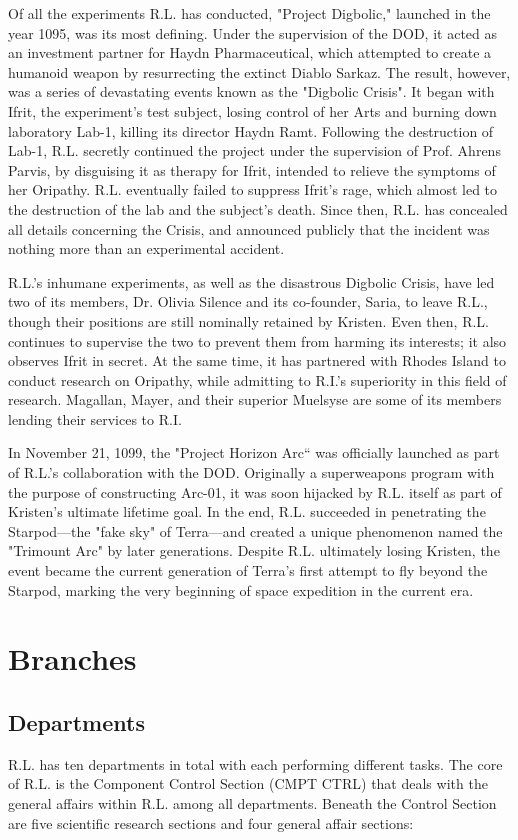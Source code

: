 \documentclass[12pt]{article}
\begin{document}
\begin{multicols}{2}
    Of all the experiments R.L. has conducted, "Project Digbolic," launched in the year 1095, was its most defining. Under the supervision of the DOD, it acted as an investment partner for Haydn Pharmaceutical, which attempted to create a humanoid weapon by resurrecting the extinct Diablo Sarkaz.\cite{4} The result, however, was a series of devastating events known as the "Digbolic Crisis". It began with Ifrit, the experiment's test subject, losing control of her Arts and burning down laboratory Lab-1, killing its director Haydn Ramt. Following the destruction of Lab-1, R.L. secretly continued the project under the supervision of Prof. Ahrens Parvis, by disguising it as therapy for Ifrit, intended to relieve the symptoms of her Oripathy. R.L. eventually failed to suppress Ifrit's rage, which almost led to the destruction of the lab and the subject's death.\cite{5} Since then, R.L. has concealed all details concerning the Crisis, and announced publicly that the incident was nothing more than an experimental accident. 

    R.L.'s inhumane experiments, as well as the disastrous Digbolic Crisis, have led two of its members, Dr. Olivia Silence and its co-founder, Saria, to leave R.L., though their positions are still nominally retained by Kristen. Even then, R.L. continues to supervise the two to prevent them from harming its interests; it also observes Ifrit in secret. At the same time, it has partnered with Rhodes Island to conduct research on Oripathy, while admitting to R.I.'s superiority in this field of research. Magallan, Mayer, and their superior Muelsyse are some of its members lending their services to R.I.

    In November 21, 1099, the "Project Horizon Arc“ was officially launched as part of R.L.'s collaboration with the DOD. Originally a superweapons program with the purpose of constructing Arc-01, it was soon hijacked by R.L. itself as part of Kristen's ultimate lifetime goal. In the end, R.L. succeeded in penetrating the Starpod—the "fake sky" of Terra—and created a unique phenomenon named the "Trimount Arc" by later generations. Despite R.L. ultimately losing Kristen, the event became the current generation of Terra's first attempt to fly beyond the Starpod, marking the very beginning of space expedition in the current era. 

\section{Branches}
\subsection{Departments}
    R.L. has ten departments in total with each performing different tasks. The core of R.L. is the Component Control Section (CMPT CTRL) that deals with the general affairs within R.L. among all departments. Beneath the Control Section are five scientific research sections and four general affair sections: 

\end{multicols}
\end{document}
